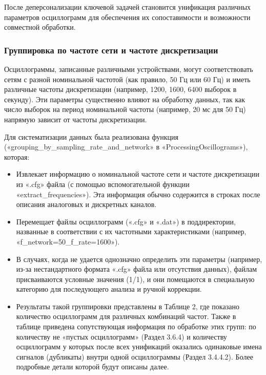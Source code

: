 После деперсонализации ключевой задачей становится унификация различных параметров осциллограмм для обеспечения их сопоставимости и возможности совместной обработки.\par\vspace{0.2cm}

\subsubsection{Группировка по частоте сети и частоте дискретизации}\label{sec:ch3_frequency_grouping}

Осциллограммы, записанные различными устройствами, могут соответствовать сетям с разной номинальной частотой (как правило, 50 Гц или 60 Гц) и иметь различные частоты дискретизации (например, 1200, 1600, 6400 выборок в секунду). Эти параметры существенно влияют на обработку данных, так как число выборок на период номинальной частоты (например, 20 мс для 50 Гц) напрямую зависит от частоты дискретизации.\par\vspace{0.2cm}

Для систематизации данных была реализована функция («grouping\_\allowbreak by\_\allowbreak sampling\_\allowbreak rate\_\allowbreak and\_\allowbreak network» в «ProcessingOscillograms»), которая:\par\vspace{0.2cm}

\begin{itemize}[itemsep=2pt,topsep=2pt]
  \item Извлекает информацию о номинальной частоте сети и частоте дискретизации из «.cfg» файла (с помощью вспомогательной функции «extract\_frequencies»). Эта информация обычно содержится в строках после описания аналоговых и дискретных каналов.
  \item Перемещает файлы осциллограмм («.cfg» и «.dat») в поддиректории, названные в соответствии с их частотными характеристиками (например, «f\_\allowbreak network=50\_\allowbreak f\_\allowbreak rate=1600»).
  \item В случаях, когда не удается однозначно определить эти параметры (например, из-за нестандартного формата «.cfg» файла или отсутствия данных), файлам присваиваются условные значения (1/1), и они помещаются в специальную категорию для последующего анализа и ручной коррекции.
  \item Результаты такой группировки представлены в Таблице 2, где показано количество осциллограмм для различных комбинаций частот. Также в таблице приведена сопутствующая информация по обработке этих групп: по количеству не «пустых осциллограмм» (Раздел 3.6.4) и количеству осциллограмм у которых после всех унификаций оказались одинаковые имена сигналов (дубликаты) внутри одной осциллограммы (Раздел 3.4.4.2). Более подробные детали которой будут описаны далее.
\end{itemize}\par\vspace{0.2cm}

